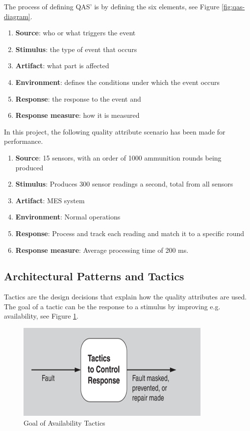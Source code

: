 The process of defining QAS' is by defining the six elements, see Figure \ref{fig:qas-diagram}.

\begin{enumerate}
    \item \textbf{Source}: who or what triggers the event
    \item \textbf{Stimulus}: the type of event that occurs
    \item \textbf{Artifact}: what part is affected
    \item \textbf{Environment}: defines the conditions under which the event occurs
    \item \textbf{Response}: the response to the event and 
    \item \textbf{Response measure}: how it is measured
\end{enumerate}

In this project, the following quality attribute scenario has been made for performance.

\begin{enumerate}
    \item \textbf{Source}: 15 sensors, with an order of 1000 ammunition rounds being produced
    \item \textbf{Stimulus}: Produces 300 sensor readings a second, total from all sensors
    \item \textbf{Artifact}: MES system
    \item \textbf{Environment}: Normal operations
    \item \textbf{Response}: Process and track each reading and match it to a specific round 
    \item \textbf{Response measure}: Average processing time of 200 ms.
\end{enumerate}

\subsection{Architectural Patterns and Tactics}
Tactics are the design decisions that explain how the quality attributes are used. The goal of a tactic can be the response to a stimulus by improving e.g. availability, see Figure \ref{fig:goal-availablity tactics}.
\begin{figure}[H]
    \centering
    \caption{Goal of Availability Tactics}
    \label{fig:goal-availablity tactics}
    \includegraphics[width=0.5\linewidth]{images/Goal of availability tactics.png}
\end{figure}

